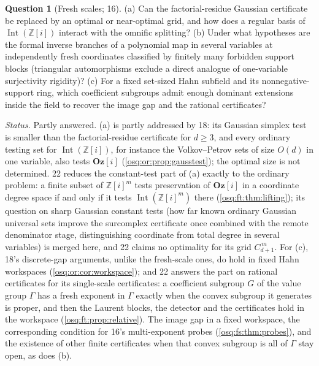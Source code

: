 \documentclass[11pt,letterpaper]{article}
\numberwithin{equation}{section}
\theoremstyle{definition}
\newtheorem{question}[question]{Question}
\theoremstyle{remark}
\theoremstyle{plain}
\newcommand{\Oz}{\mathbf{Oz}}
\newcommand{\GOz}{\Oz[i]}
\newcommand{\Z}{\mathbb Z}
\newcommand{\Int}{\operatorname{Int}}
\begin{document}
\begin{question}[Fresh scales; 16]\label{osq:fs:q:fresh}
(a) Can the factorial-residue Gaussian certificate be replaced by an optimal or near-optimal grid, and how does a regular basis
of $\Int(\Z[i])$ interact with the omnific splitting? (b) Under what hypotheses are the formal inverse branches of a polynomial
map in several variables at independently fresh coordinates classified by finitely many forbidden support blocks (triangular
automorphisms exclude a direct analogue of one-variable surjectivity rigidity)? (c) For a fixed set-sized Hahn subfield and its
nonnegative-support ring, which coefficient subgroups admit enough dominant extensions inside the field to recover the image
gap and the rational certificates?
\end{question}
\emph{Status.} Partly answered. (a) is partly addressed by 18: its Gaussian simplex test is smaller than the factorial-residue certificate for
$d\ge3$, and every ordinary testing set for $\Int(\Z[i])$, for instance the Volkov--Petrov sets of size $O(d)$ in one variable, also tests
$\GOz$ (\cref{osq:or:prop:gausstest}); the optimal size is not determined. 22 reduces the constant-test part of (a) exactly to the ordinary
problem: a finite subset of $\Z[i]^m$ tests preservation of $\GOz$ in a coordinate degree space if and only if it tests $\Int(\Z[i]^m)$ there
(\cref{osq:ft:thm:lifting}); its question on sharp Gaussian constant tests (how far known ordinary Gaussian universal sets improve the surcomplex
certificate once combined with the remote denominator stage, distinguishing coordinate from total degree in several variables) is merged here, and
22 claims no optimality for its grid $C_{d+1}^{\,m}$. For (c), 18's discrete-gap arguments, unlike the fresh-scale
ones, do hold in fixed Hahn workspaces (\cref{osq:or:cor:workspace}); and 22 answers the part on rational certificates for its single-scale
certificates: a coefficient subgroup $G$ of the value group $\Gamma$ has a fresh exponent in $\Gamma$ exactly when the convex subgroup it generates is
proper, and then the Laurent blocks, the detector and the certificates hold in the workspace (\cref{osq:ft:prop:relative}). The image gap in a fixed
workspace, the corresponding condition for 16's multi-exponent probes (\cref{osq:fs:thm:probes}), and the existence of other finite certificates when
that convex subgroup is all of $\Gamma$ stay open, as does (b).
\end{document}
